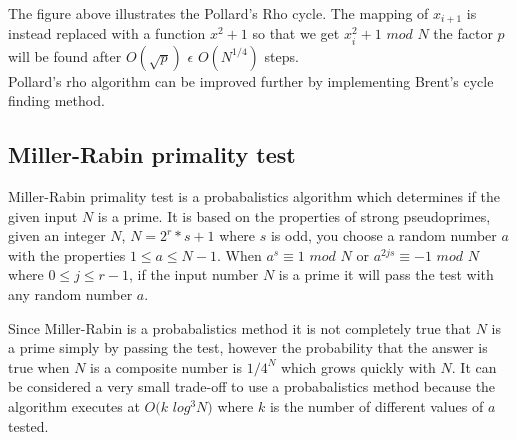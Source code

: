 The figure above illustrates the Pollard's Rho cycle. The mapping of $x_{i+1}$ is instead replaced with a function $x^2+1$ so that we get $x^2_{i}+1$  $mod$ $N$ the factor $p$ will be found after $O(\sqrt{p})$  $\epsilon$ $O(N^{1/4})$ steps. \cite{avalg}\\

Pollard's rho algorithm can be improved further by implementing Brent's cycle finding method. \cite{brent}

\subsection{Miller-Rabin primality test}
Miller-Rabin primality test is a probabalistics algorithm which determines if the given input $N$ is a prime. It is based on the properties of strong pseudoprimes, given an integer $N$, $N = 2^r * s + 1$ where $s$ is odd, you choose a random number $a$ with the properties $1 \leq a \leq N - 1$. When $a^s \equiv 1$ $mod$ $N$ or $a^{2js} \equiv - 1$ $mod$ $N$ where $0 \leq j \leq r - 1$, if the input number $N$ is a prime it will pass the test with any random number $a$.

Since Miller-Rabin is a probabalistics method it is not completely true that $N$ is a prime simply by passing the test, however the probability that the answer is true when $N$ is a composite number is $1 / 4^{N}$ which grows quickly with $N$. It can be considered a very small trade-off to use a probabalistics method because the algorithm executes at $O(k$ $log^3 N)$ where $k$ is the number of different values of $a$ tested. \cite{miller}